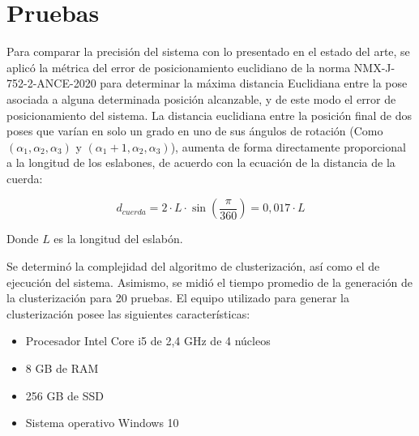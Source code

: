 \section{Pruebas}

Para comparar la precisión del sistema con lo presentado en el estado del arte, se aplicó la métrica del error de posicionamiento euclidiano de la norma NMX-J-752-2-ANCE-2020 para determinar la máxima distancia Euclidiana entre la pose asociada a alguna determinada posición alcanzable, y de este modo el error de posicionamiento del sistema. La distancia euclidiana entre la posición final de dos poses que varían en solo un grado en uno de sus ángulos de rotación (Como $(\alpha_1,\alpha_2,\alpha_3)$ y $(\alpha_1 + 1, \alpha_2, \alpha_3)$), aumenta de forma directamente proporcional a la longitud de los eslabones, de acuerdo con la ecuación de la distancia de la cuerda:

\begin{equation}
	d_{cuerda} = 2 \cdot L \cdot \sin(\frac{\pi}{360}) = 0,017 \cdot L
\end{equation}

Donde $L$ es la longitud del eslabón.

Se determinó la complejidad del algoritmo de clusterización, así como el de ejecución del sistema. Asimismo, se midió el tiempo promedio de la generación de la clusterización para 20 pruebas. El equipo utilizado para generar la clusterización posee las siguientes características:

\begin{itemize}
	\item Procesador Intel Core i5 de 2,4 GHz de 4 núcleos
	\item 8 GB de RAM
	\item 256 GB de SSD
	\item Sistema operativo Windows 10
\end{itemize}

